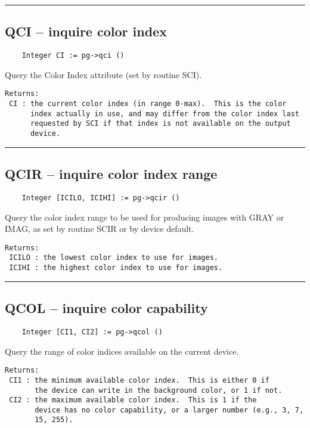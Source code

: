 \hrule

\subsection*{QCI -- inquire color index }

\begin{verbatim}
    Integer CI := pg->qci ()
\end{verbatim}

Query the Color Index attribute (set by routine SCI).

\begin{verbatim}
Returns:
 CI : the current color index (in range 0-max).  This is the color
      index actually in use, and may differ from the color index last
      requested by SCI if that index is not available on the output
      device. 
\end{verbatim}

\hrule

\subsection*{QCIR -- inquire color index range }

\begin{verbatim}
    Integer [ICILO, ICIHI] := pg->qcir ()
\end{verbatim}

Query the color index range to be used for producing images with GRAY
or IMAG, as set by routine SCIR or by device default.

\begin{verbatim}
Returns:
 ICILO : the lowest color index to use for images.
 ICIHI : the highest color index to use for images.
\end{verbatim}

\hrule

\subsection*{QCOL -- inquire color capability }

\begin{verbatim}
    Integer [CI1, CI2] := pg->qcol ()
\end{verbatim}

Query the range of color indices available on the current device.

\begin{verbatim}
Returns:
 CI1 : the minimum available color index.  This is either 0 if
       the device can write in the background color, or 1 if not. 
 CI2 : the maximum available color index.  This is 1 if the
       device has no color capability, or a larger number (e.g., 3, 7,
       15, 255). 
\end{verbatim}

